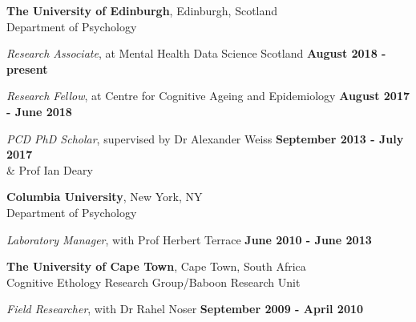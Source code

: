 \documentclass[margin,line]{res}
\begin{document}
\begin{resume}
{\bf The University of Edinburgh}, Edinburgh, Scotland \\
Department of Psychology

\vspace{-.2cm}
{\em Research Associate}, at Mental Health Data Science Scotland \hfill {\bf August 2018 - present}\\
\vspace{-.1cm}

\vspace{-.2cm}
{\em Research Fellow}, at Centre for Cognitive Ageing and Epidemiology \hfill {\bf August 2017 - June 2018}\\
\vspace{-.1cm}


\vspace{-.2cm}
{\em PCD PhD Scholar}, supervised by Dr Alexander Weiss \hfill {\bf September 2013 - July 2017}\\
\-\hspace{4.75cm} \& Prof Ian Deary
\vspace{-.1cm}


{\bf Columbia University}, New York, NY \\
Department of Psychology

\vspace{-.2cm}
{\em Laboratory Manager}, with Prof Herbert  Terrace \hfill {\bf June 2010 - June 2013}\\
\vspace{-.3cm}


\vspace{-.1cm}

{\bf The University of Cape Town}, Cape Town, South Africa \\
Cognitive Ethology Research Group/Baboon Research Unit

\vspace{-.2cm}
{\em Field Researcher}, with Dr Rahel Noser \hfill {\bf September 2009 - April 2010}\\
\vspace{-.3cm}



\end{resume}
\end{document}
